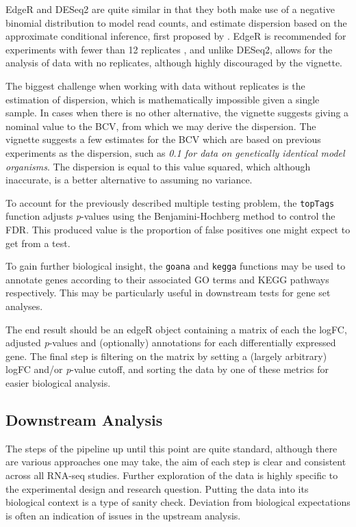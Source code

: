 EdgeR and DESeq2 are quite similar in that they both make use of a negative binomial distribution to model read counts, and estimate dispersion based on the approximate conditional inference, first proposed by \cite{cox1987parameter}.  EdgeR is recommended for experiments with fewer than 12 replicates \citep{schurch2015evaluation}, and unlike DESeq2, allows for the analysis of data with no replicates, although highly discouraged by the vignette. 

The biggest challenge when working with data without replicates is the estimation of dispersion, which is mathematically impossible given a single sample. In cases when there is no other alternative, the vignette suggests giving a nominal value to the \ac{BCV}, from which we may derive the dispersion. The vignette suggests a few estimates for the \ac{BCV} which are based on previous experiments as the dispersion, such as \textit{0.1 for data on genetically identical model organisms}. The dispersion is equal to this value squared, which although inaccurate, is a better alternative to assuming no variance.

To account for the previously described multiple testing problem, the \texttt{topTags} function adjusts \textit{p}-values using the Benjamini-Hochberg method \citep{benjamini1995controlling} to control the \ac{FDR}. This produced value is the proportion of false positives one might expect to get from a test. 

To gain further biological insight, the \texttt{goana} and \texttt{kegga} functions may be used to annotate genes according to their associated \ac{GO} terms and \ac{KEGG} pathways respectively. This may be particularly useful in downstream tests for gene set analyses.

The end result should be an edgeR object containing a matrix of each the \ac{logFC}, adjusted \textit{p}-values and (optionally) annotations for each differentially expressed gene. The final step is filtering on the matrix by setting a (largely arbitrary) \ac{logFC} and/or \textit{p}-value cutoff, and sorting the data by one of these metrics for easier biological analysis.

\subsection{Downstream Analysis}
The steps of the pipeline up until this point are quite standard, although there are various approaches one may take, the aim of each step is clear and consistent across all RNA-seq studies. Further exploration of the data is highly specific to the experimental design and research question. Putting the data into its biological context is a type of sanity check. Deviation from biological expectations is often an indication of issues in the upstream analysis.


